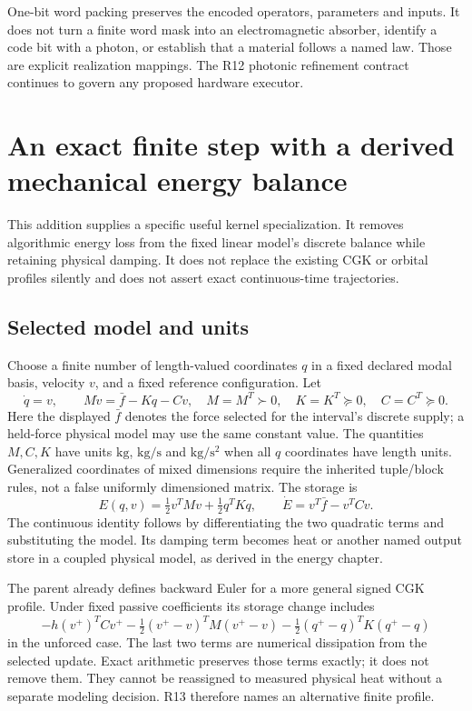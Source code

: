 One-bit word packing preserves the encoded operators, parameters and inputs.
It does not turn a finite word mask into an electromagnetic absorber, identify
a code bit with a photon, or establish that a material follows a named law.
Those are explicit realization mappings. The R12 photonic refinement contract
continues to govern any proposed hardware executor.

\section{An exact finite step with a derived mechanical energy balance}
\label{sec:r13-step}
This addition supplies a specific useful kernel specialization. It removes
algorithmic energy loss from the fixed linear model's discrete balance while
retaining physical damping. It does not replace the existing CGK or orbital
profiles silently and does not assert exact continuous-time trajectories.

\subsection{Selected model and units}
Choose a finite number of length-valued coordinates $q$ in a fixed declared
modal basis, velocity $v$, and a fixed reference configuration. Let
\begin{equation}
 \dot q=v,\qquad M\dot v=\bar f-Kq-Cv,
 \quad M=M^T\succ0,\quad K=K^T\succeq0,\quad C=C^T\succeq0.
 \label{eq:r13-linear-model}
\end{equation}
Here the displayed $\bar f$ denotes the force selected for the interval's
discrete supply; a held-force physical model may use the same constant value.
The quantities $M,C,K$ have units $\mathrm{kg}$, $\mathrm{kg/s}$ and
$\mathrm{kg/s^2}$ when all $q$ coordinates have length units. Generalized
coordinates of mixed dimensions require the inherited tuple/block rules,
not a false uniformly dimensioned matrix. The storage is
\begin{equation}
 E(q,v)=\tfrac12v^TMv+\tfrac12q^TKq,
 \qquad \dot E=v^T\bar f-v^TCv.
 \label{eq:r13-mech-storage}
\end{equation}
The continuous identity follows by differentiating the two quadratic terms
and substituting the model. Its damping term becomes heat or another named
output store in a coupled physical model, as derived in the energy chapter.

The parent already defines backward Euler for a more general signed CGK
profile. Under fixed passive coefficients its storage change includes
\begin{equation}
 -h(v^+)^TCv^+
 -\tfrac12(v^+-v)^TM(v^+-v)
 -\tfrac12(q^+-q)^TK(q^+-q)
\end{equation}
in the unforced case. The last two terms are numerical dissipation from the
selected update. Exact arithmetic preserves those terms exactly; it does not
remove them. They cannot be reassigned to measured physical heat without a
separate modeling decision. R13 therefore names an alternative finite profile.

